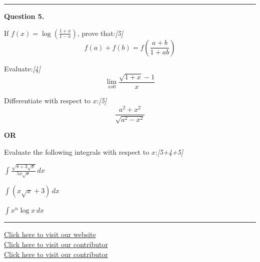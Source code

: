 \documentclass[11pt,a4paper]{article}
\newcommand{\pts}[1]{\hfill   \textit{[#1]}}
\begin{document}
\medskip\rule{\linewidth}{0.2pt}




\noindent   \textbf{Question 5.}

\begin{parts}
  \item If $f(x) = \log\left(\frac{1+x}{1-x}\right)$, prove that:\pts{5}
  \[
  f(a) + f(b) = f\left(\frac{a+b}{1+ab}\right)
  \]
  \item Evaluate:\pts{4}
  \[
  \lim_{x  o 0} \frac{\sqrt{1+x} - 1}{x}
  \]
  \item Differentiate with respect to $x$:\pts{5}
  \[
  \frac{a^2 + x^2}{\sqrt{a^2 - x^2}}
  \]
\end{parts}

\centerline{   \textbf{OR}}

Evaluate the following integrals with respect to $x$:\pts{5+4+5}

\begin{parts}
  \item $\displaystyle \int \frac{\sqrt{8 + 3\sqrt{x}}}{5x\sqrt{x}} \, dx$
  \item $\displaystyle \int (x\sqrt{x} + 3) \, dx$
  \item $\displaystyle \int x^n \log x \, dx$
\end{parts}

\vfill
\rule{\linewidth}{0.4pt}

\begin{center}\small
  \href{https://bhu-exam.vercel.app/}{Click here to visit our website}\\[4pt]
  \href{https://me-aryan.vercel.app/}{Click here to visit our contributor}\\[4pt]
  \href{https://quashan-me.vercel.app/}{Click here to visit our contributor}
\end{center}
\end{document}

